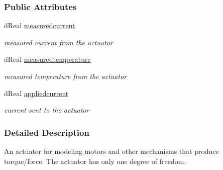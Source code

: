 \subsubsection*{Public Attributes}
\begin{DoxyCompactItemize}
\item 
\hypertarget{classOpenRAVE_1_1SensorBase_1_1ActuatorSensorData_a63e8fdafcf41e40ff6d9d7289bd1c305}{
dReal \hyperlink{classOpenRAVE_1_1SensorBase_1_1ActuatorSensorData_a63e8fdafcf41e40ff6d9d7289bd1c305}{measuredcurrent}}
\label{classOpenRAVE_1_1SensorBase_1_1ActuatorSensorData_a63e8fdafcf41e40ff6d9d7289bd1c305}

\begin{DoxyCompactList}\small\item\em measured current from the actuator \item\end{DoxyCompactList}\item 
\hypertarget{classOpenRAVE_1_1SensorBase_1_1ActuatorSensorData_a02579f8c545c868b31b89bf00c194f53}{
dReal \hyperlink{classOpenRAVE_1_1SensorBase_1_1ActuatorSensorData_a02579f8c545c868b31b89bf00c194f53}{measuredtemperature}}
\label{classOpenRAVE_1_1SensorBase_1_1ActuatorSensorData_a02579f8c545c868b31b89bf00c194f53}

\begin{DoxyCompactList}\small\item\em measured temperature from the actuator \item\end{DoxyCompactList}\item 
\hypertarget{classOpenRAVE_1_1SensorBase_1_1ActuatorSensorData_ad9a9a10b35c10cc05a1a5acd2bb7882b}{
dReal \hyperlink{classOpenRAVE_1_1SensorBase_1_1ActuatorSensorData_ad9a9a10b35c10cc05a1a5acd2bb7882b}{appliedcurrent}}
\label{classOpenRAVE_1_1SensorBase_1_1ActuatorSensorData_ad9a9a10b35c10cc05a1a5acd2bb7882b}

\begin{DoxyCompactList}\small\item\em current sent to the actuator \item\end{DoxyCompactList}\end{DoxyCompactItemize}


\subsubsection{Detailed Description}
An actuator for modeling motors and other mechanisms that produce torque/force. The actuator has only one degree of freedom. 

